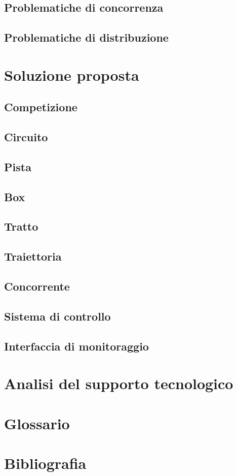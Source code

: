 \documentclass[a4paper]{book}
\begin{document}
\section{Problematiche di concorrenza}

\section{Problematiche di distribuzione}

\chapter{Soluzione proposta}

\section{Competizione}
\section{Circuito}
\section{Pista}
\section{Box}
\section{Tratto}
\section{Traiettoria}
\section{Concorrente}
\section{Sistema di controllo}
\section{Interfaccia di monitoraggio}
\chapter{Analisi del supporto tecnologico}

\chapter{Glossario}
\chapter{Bibliografia}
\end{document}
